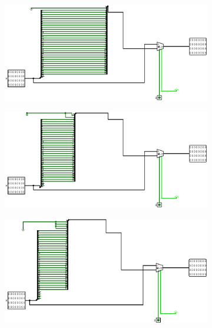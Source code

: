 \documentclass[a4paper,12pt]{article}
\begin{document}
\begin{figure}[H]
    \centering
    \begin{subfigure}[b]{0.3\textwidth}
        \centering
        \includegraphics[width=\linewidth]{1 bit leftShifter.png}
    \end{subfigure}
    \hfill
    \begin{subfigure}[b]{0.3\textwidth}
        \centering
        \includegraphics[width=\linewidth]{2 bit leftShifter.png}
    \end{subfigure}
    \hfill
    \begin{subfigure}[b]{0.3\textwidth}
        \centering
        \includegraphics[width=\linewidth]{4 bit leftShifter.png}
    \end{subfigure}
    \newline
    \newline
    \vspace{1em}


\end{figure}
\end{document}
